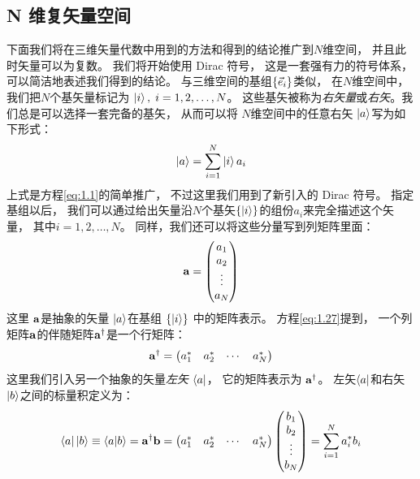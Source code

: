 \subsection{N 维复矢量空间}
\label{sec:1.1.4}
下面我们将在三维矢量代数中用到的方法和得到的结论推广到$N$维空间，
并且此时矢量可以为复数。
我们将开始使用 Dirac 符号，
这是一套强有力的符号体系，
可以简洁地表述我们得到的结论。
与三维空间的基组$\left\{ \vec{e}_{i} \right\}$类似，
在$N$维空间中，
我们把$N$个基矢量标记为 $\Ket{i},\; i = 1, 2, \dots, N$。
这些基矢被称为\emph{右矢量}或\emph{右矢}。我
们总是可以选择一套完备的基矢，
从而可以将 $N$维空间中的任意右矢 $\Ket{a}$写为如下形式：
\begin{equation}
 \Ket{a} = \sum_{i=1}^{N} \Ket{i} a_i
 \label{eq:1.41}
\end{equation}
上式是方程\eqref{eq:1.1}的简单推广，
不过这里我们用到了新引入的 Dirac 符号。
指定基组以后，
我们可以通过给出矢量沿$N$个基矢$\left\{\Ket{i}\right\}$的组份$a_i$来完全描述这个矢量，
其中$i = 1, 2, \dots, N$。
同样，我们还可以将这些分量写到列矩阵里面：
\begin{equation}
 {\mathbf a} = \begin{pmatrix}
     a_1 \\ a_2 \\ \vdots \\ a_N
 \end{pmatrix}
 \label{eq:1.42}
\end{equation}
这里 $\mathbf a$是抽象的矢量 $\Ket{a}$在基组 $\left\{\Ket{i}\right\}$ 中的矩阵表示。
方程\eqref{eq:1.27}提到，
一个列矩阵$\mathbf a$的伴随矩阵$\mathbf a^\dagger$是一个行矩阵：
\begin{equation}
 \mathbf a^\dagger = \begin{pmatrix}
     a_1^\ast & a_2^\ast &\cdots &a_N^\ast
 \end{pmatrix}
 \label{eq:1.43}
\end{equation}
这里我们引入另一个抽象的矢量\emph{左矢} $\Bra{a}$，
它的矩阵表示为 $\mathbf a^\dagger$。
左矢$\Bra{a}$和右矢$\Ket{b}$之间的标量积定义为：
\begin{equation}
 \Bra{a}\Ket{b} \equiv \langle a \vert b \rangle = \mathbf a^\dagger\mathbf{b} = \begin{pmatrix}
     a_1^\ast & a_2^\ast &\cdots &a_N^\ast
 \end{pmatrix} \begin{pmatrix}
     b_1 \\ b_2 \\ \vdots \\ b_N
 \end{pmatrix} = \sum_{i=1}^N a_i^\ast b_i
 \label{eq:1.44}
\end{equation}
